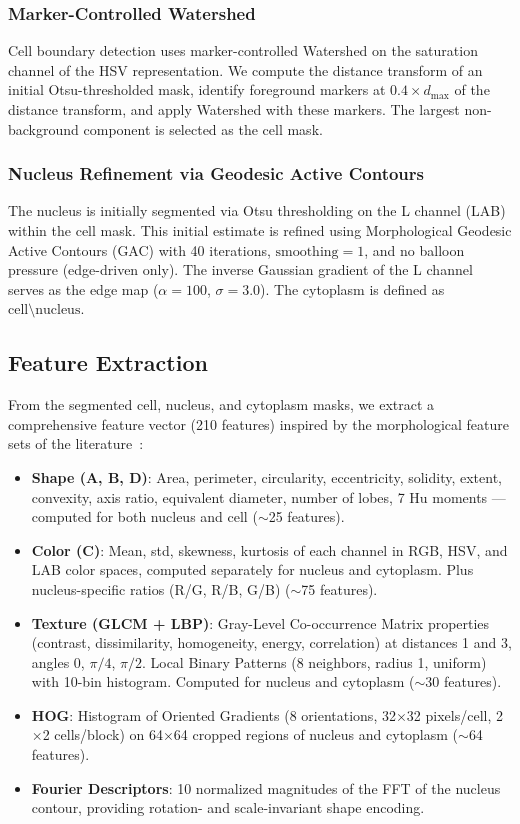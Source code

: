 \documentclass[twocolumn,a4paper]{article}
\begin{document}
\subsubsection{Marker-Controlled Watershed}

Cell boundary detection uses marker-controlled Watershed on the saturation channel of the HSV representation. We compute the distance transform of an initial Otsu-thresholded mask, identify foreground markers at $0.4 \times d_{\max}$ of the distance transform, and apply Watershed with these markers. The largest non-background component is selected as the cell mask.

\subsubsection{Nucleus Refinement via Geodesic Active Contours}

The nucleus is initially segmented via Otsu thresholding on the L channel (LAB) within the cell mask. This initial estimate is refined using Morphological Geodesic Active Contours (GAC) with 40 iterations, $\text{smoothing}=1$, and no balloon pressure (edge-driven only). The inverse Gaussian gradient of the L channel serves as the edge map ($\alpha=100$, $\sigma=3.0$). The cytoplasm is defined as $\text{cell} \setminus \text{nucleus}$.

\subsection{Feature Extraction}

From the segmented cell, nucleus, and cytoplasm masks, we extract a comprehensive feature vector (210 features) inspired by the morphological feature sets of the literature~\cite{gautam2014, aldulaimi2018}:

\begin{itemize}
    \item \textbf{Shape (A, B, D)}: Area, perimeter, circularity, eccentricity, solidity, extent, convexity, axis ratio, equivalent diameter, number of lobes, 7 Hu moments --- computed for both nucleus and cell ($\sim$25 features).
    \item \textbf{Color (C)}: Mean, std, skewness, kurtosis of each channel in RGB, HSV, and LAB color spaces, computed separately for nucleus and cytoplasm. Plus nucleus-specific ratios (R/G, R/B, G/B) ($\sim$75 features).
    \item \textbf{Texture (GLCM + LBP)}: Gray-Level Co-occurrence Matrix properties (contrast, dissimilarity, homogeneity, energy, correlation) at distances 1 and 3, angles 0, $\pi/4$, $\pi/2$. Local Binary Patterns (8 neighbors, radius 1, uniform) with 10-bin histogram. Computed for nucleus and cytoplasm ($\sim$30 features).
    \item \textbf{HOG}: Histogram of Oriented Gradients (8 orientations, 32$\times$32 pixels/cell, 2$\times$2 cells/block) on 64$\times$64 cropped regions of nucleus and cytoplasm ($\sim$64 features).
    \item \textbf{Fourier Descriptors}: 10 normalized magnitudes of the FFT of the nucleus contour, providing rotation- and scale-invariant shape encoding.
\end{itemize}
\end{document}
